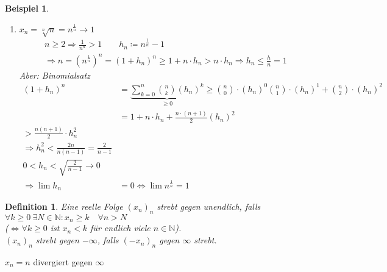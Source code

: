 \documentclass[11pt, twoside, a4paper]{article}
\theoremstyle{plain}
\newtheorem{definition}[blockelement]{Definition}
\newtheorem{beispiel}[blockelement]{Beispiel}
\newcommand{\pair}[1]{\left(#1\right)}
\newcommand{\equivalent}[0]{\Leftrightarrow{}}
\newcommand{\impl}[0]{\Rightarrow{}}
\newcommand{\definedas}[0]{\coloneqq}
\newcommand{\fromto}{\rightarrow{}}
\newcommand{\naturalnumbers}{\mathbb{N}}
\begin{document}
\begin{beispiel}
\begin{enumerate}
\begin{align*}
                b &= \frac{1}{a} > 1\\
                \impl \lim b^\frac{1}{n} &= 1\\
                &=\lim \frac{1}{a^\frac{1}{n}} &\impl \lim a^{\frac{1}{n}} = 1
            \end{align*}
            \item $x_n = \sqrt[n]{n} = n^\frac{1}{n}\fromto 1$
            \begin{align*}
                n \geq 2 \impl \frac{1}{n^n} > 1\qquad h_n \definedas n^{\frac{1}{n}} - 1\\
                \impl n = \pair{n^\frac{1}{n}}^n = \pair{1+h_n}^n \geq 1+n\cdot h_n > n\cdot h_n \impl h_n \leq \frac{h}{n} = 1
            \end{align*}
            Aber: Binomialsatz
            \begin{align*}
                \pair{1+h_n}^n &= \underbrace{\sum_{k=0}^{n} \binom{n}{k}\pair{h_n}^k}_{\geq 0} \geq \binom{n}{0}\cdot \pair{h_n}^0 \binom{n}{1}\cdot \pair{h_n}^1 + \binom{n}{2}\cdot \pair{h_n}^2\\
                &= 1 + n\cdot h_n + \frac{n\cdot(n+1)}{2}(h_n)^2\\
                > \frac{n(n+1)}{2}\cdot h_n^2\\
                \impl h_n^2 < \frac{2n}{n(n-1)} = \frac{2}{n-1}\\
                0 < h_n < \sqrt{\frac{2}{n-1}} \fromto 0\\
                \impl \lim h_n &= 0 \equivalent \lim n^{\frac{1}{n}} = 1
            \end{align*}
        \end{enumerate}
    \end{beispiel}

    \begin{definition}
        Eine reelle Folge $(x_n)_n$ strebt gegen unendlich, falls $\forall k \geq 0~\exists N\in\naturalnumbers\colon x_n \geq k\quad \forall n> N$\\
        ($\equivalent \forall k \geq 0$ ist $x_n < k$ für endlich viele $n\in\naturalnumbers$).\\
        $(x_n)_n$ strebt gegen $-\infty$, falls $(-x_n)_n$ gegen $\infty$ strebt.
    \end{definition}

    $x_n=n$ divergiert gegen $\infty$
\end{document}
